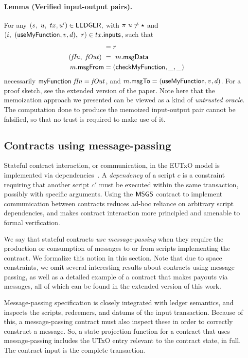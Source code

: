 \paragraph{Lemma (Verified input-output pairs). }
\label{lem:io-pairs}
For any $(s,~u,~tx, u') \in \mathsf{LEDGER}$, with $\pi~u \neq \star$ and
$(i, ~(\mathsf{useMyFunction}, v, d),~ r) \in tx.\mathsf{inputs}$,
such that
\begin{align*}
  [(\receive,~m)] &= r \\
  (\var{fIn},~\var{fOut}) ~&=~m.\fun{msgData} \\
  m.\fun{msgFrom} &= (\mathsf{checkMyFunction}, \_, \_)
\end{align*}
%
necessarily $\mathsf{myFunction}~\mathit{fIn} = \mathit{fOut}$, and
$m.\mathsf{msgTo} = (\mathsf{useMyFunction}, v, d)$.
For a proof sketch, see the extended version of the paper.
Note here that the memoization approach we presented can be viewed as a kind of
\emph{untrusted oracle}. The computation done to produce the memoized
input-output pair cannot be falsified, so that no trust is required to make
use of it.

\subsection{Contracts using message-passing}
\label{sec:async}

Stateful contract interaction, or communication, in the EUTxO model is implemented
via dependencies~\cite{eutxoma}. A \emph{dependency} of a script $c$ is a constraint requiring that another
script $c'$ must be executed within the same transaction, possibly with specific
arguments. Using the $\mathsf{MSGS}$ contract to implement communication between contracts
reduces ad-hoc reliance on arbitrary
script dependencies, and makes contract interaction more principled and
amenable to formal verification.

We say that stateful contracts \emph{use message-passing}
when they require the production or
consumption of messages to or from scripts implementing the contract.
We formalize this notion in this section. Note that due to space constraints, we
omit several interesting results about contracts using message-passing, as well as
a detailed example of a contract that makes payouts via messages, all of which can be found
in the extended version of this work.

Message-passing specification is closely integrated with ledger semantics,
and inspects the scripts, redeemers, and datums of the input transaction.
Because of this, a message-passing contract must also inspect these
in order to correctly construct a message. So, a state projection function
for a contract that uses message-passing includes the UTxO entry relevant
to the contract state, in full. The contract input is the complete transaction.

